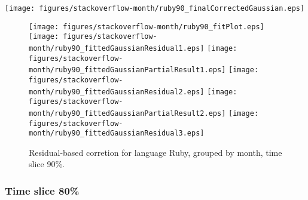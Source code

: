 \begin{center}
{\texttt{[image: figures/stackoverflow-month/ruby90\_finalCorrectedGaussian.eps]}}
\end{center}

\FloatBarrier

\begin{figure}[t]
\centering
{}
{\texttt{[image: figures/stackoverflow-month/ruby90\_fitPlot.eps]}}
{\texttt{[image: figures/stackoverflow-month/ruby90\_fittedGaussianResidual1.eps]}}
{\texttt{[image: figures/stackoverflow-month/ruby90\_fittedGaussianPartialResult1.eps]}}
{\texttt{[image: figures/stackoverflow-month/ruby90\_fittedGaussianResidual2.eps]}}
{\texttt{[image: figures/stackoverflow-month/ruby90\_fittedGaussianPartialResult2.eps]}}
{\texttt{[image: figures/stackoverflow-month/ruby90\_fittedGaussianResidual3.eps]}}
\caption{Residual-based corretion for language Ruby, grouped by month, time slice 90\%.}
\end{figure}


\FloatBarrier


\subsubsection{Time slice 80\%}

